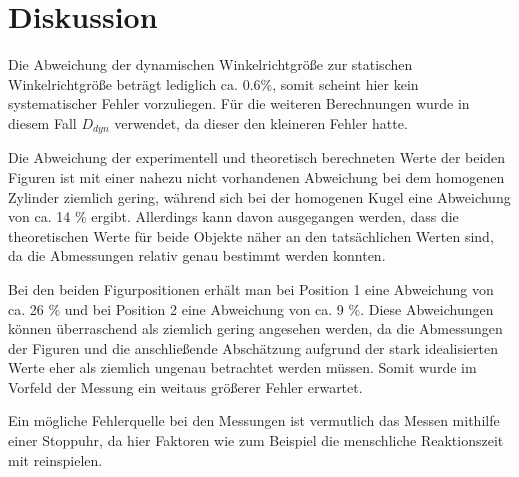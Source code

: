 \newpage

\section{Diskussion}

Die Abweichung der dynamischen Winkelrichtgröße zur statischen Winkelrichtgröße beträgt lediglich
ca. $0.6 \%$, somit scheint hier kein systematischer Fehler vorzuliegen. Für die weiteren Berechnungen
wurde in diesem Fall $D_{dyn}$ verwendet, da dieser den kleineren Fehler hatte.

Die Abweichung der experimentell und theoretisch berechneten Werte der beiden Figuren ist mit einer nahezu
nicht vorhandenen Abweichung bei dem homogenen Zylinder ziemlich gering, während sich bei der homogenen Kugel eine
Abweichung von ca. 14 $\%$ ergibt. Allerdings kann davon ausgegangen
werden, dass die theoretischen Werte für beide Objekte näher an den tatsächlichen Werten sind, da
die Abmessungen relativ genau bestimmt werden konnten.

Bei den beiden Figurpositionen erhält man bei Position 1 eine Abweichung von ca. 26 $\%$ und bei Position 2 eine
Abweichung von ca. 9 $\%$. Diese Abweichungen können
überraschend als ziemlich gering angesehen werden, da die Abmessungen der Figuren und die anschließende
Abschätzung aufgrund der stark idealisierten Werte eher als ziemlich ungenau betrachtet werden müssen.
Somit wurde im Vorfeld der Messung ein weitaus größerer Fehler erwartet.

Ein mögliche Fehlerquelle bei den Messungen ist vermutlich das Messen mithilfe einer Stoppuhr,
da hier Faktoren wie zum Beispiel die menschliche Reaktionszeit mit reinspielen.

\newpage

\printbibliography


